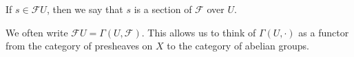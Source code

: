 If $s \in \mathcal{F}U$, then we say that $s$ is a section of $\mathcal{F}$ over $U$.

We often write $\mathcal{F}U = \Gamma(U, \mathcal{F})$. This allows us to think
of $\Gamma(U, \cdot)$ as a functor from the category of presheaves on $X$ to the
category of abelian groups.
